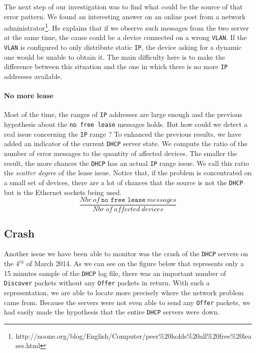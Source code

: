 The next step of our investigation was to find what could be the source of that error pattern. We found an interesting answer on an online post from a network administrator\footnote{http://noone.org/blog/English/Computer/peer\%20holds\%20all\%20free\%20leases.html}. He explains that if we observe such messages from the two server at the same time, the cause could be a device connected on a wrong \texttt{VLAN}. If the \texttt{VLAN} is configured to only distribute static \texttt{IP}, the device asking for a dynamic one would be unable to obtain it. The main difficulty here is to make the difference between this situation and the one in which there is no more \texttt{IP} addresses available.


\paragraph*{No more lease} Most of the time, the ranges of \texttt{IP} addresses are large enough and the previous hypothesis about the \texttt{no free lease} messages holds. But how could we detect a real issue concerning the \texttt{IP} range ? To enhanced the previous results, we have added an indicator of the current \texttt{DHCP} server state. We compute the ratio of the number of error messages to the quantity of affected devices. The smaller the result, the more chances the \texttt{DHCP} has an actual \texttt{IP} range issue. We call this ratio the \emph{scatter degree} of the lease issue. Notice that, if the problem is concentrated on a small set of devices, there are a lot of chances that the source is not the \texttt{DHCP} but is the Ethernet sockets being used.
\[ \frac{Nbr\ of\ \texttt{no free lease}\ messages}{Nbr\ of\ affected\ devices} \] 


\subsection{Crash}
Another issue we have been able to monitor was the crash of the \texttt{DHCP} servers on the 4$^{th}$ of March 2014. As we can see on the figure below that represents only a 15 minutes sample of the \texttt{DHCP} log file, there was an important number of \texttt{Discover} packets without any \texttt{Offer} packets in return. With such a representation, we are able to locate more precisely where the network problem came from. Because the servers were not even able to send any \texttt{Offer} packets, we had easily made the hypothesis that the entire \texttt{DHCP} servers were down.

